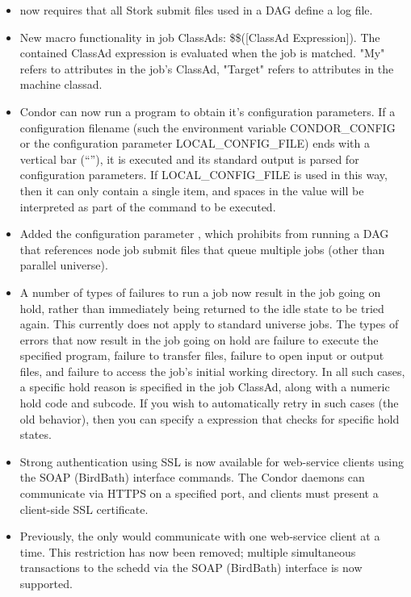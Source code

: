 \begin{itemize}
\item {} now requires that all Stork submit files used
in a DAG define a log file.

\item New macro functionality in job ClassAds: \$\$([ClassAd Expression]).  The contained ClassAd expression is evaluated when the job is matched.  "My" refers to attributes in the job's ClassAd, "Target" refers to attributes in the machine classad.

\item Condor can now run a program to obtain it's configuration
parameters.
If a configuration filename (such the environment variable CONDOR\_CONFIG
or the configuration parameter LOCAL\_CONFIG\_FILE) ends with a vertical
bar (``\Bar''), it is executed and its standard output is parsed
for configuration parameters. If LOCAL\_CONFIG\_FILE is used in this way,
then it can only contain a single item, and spaces in the value will be
interpreted as part of the command to be executed.

\item Added the  configuration parameter
, which prohibits 
from running a DAG that references node job submit files that
queue multiple jobs (other than parallel universe).

\item A number of types of failures to run a job now result in the job
going on hold, rather than immediately being returned to the idle
state to be tried again.  This currently does not apply to
standard universe jobs.  The types of errors that now result in the
job going on hold are failure to execute the specified program,
failure to transfer files, failure to open input or output files,
and failure to access the job's initial working directory.
In all such cases, a specific hold reason is specified in the job
ClassAd, along with a numeric hold code and subcode.  If you wish to
automatically retry in such cases (the old behavior), then you can
specify a  expression that checks for
specific hold states.

\item Strong authentication using SSL is now available for web-service clients
using the SOAP (BirdBath) interface commands.  The Condor daemons can
communicate via HTTPS on a specified port, and clients must present a
client-side SSL certificate.

\item Previously, the  only would communicate with one
web-service client at a time.  This restriction has now been removed; multiple
simultaneous transactions to the schedd via the SOAP (BirdBath) interface is
now supported.


\end{itemize}
